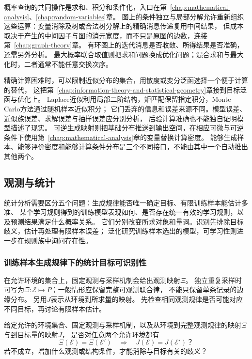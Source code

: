 概率查询的共同操作是求和、积分和条件化，入口在第~\ref{chap:mathematical-analysis}、\ref{chap:random-variables}章。
图上的条件独立与局部分解允许重新组织这些运算：变量消除及树或合法树分解上的精确消息传递复用中间结果，
但成本取决于产生的中间因子与图的消元宽度，而不只是原图的边数，连接第~\ref{chap:graph-theory}章。
有环图上的迭代消息是否收敛、所得结果是否准确，还需另外分析。
最大概率联合取值则把求和问题换成优化问题；混合求和与最大化时，二者通常不能任意交换次序。

精确计算困难时，可以限制近似分布的集合，用散度或变分泛函选择一个便于计算的替代，
这把第~\ref{chap:information-theory-and-statistical-geometry}章接到目标泛函与优化上。
Laplace近似利用局部二阶结构，矩匹配保留指定积分，Monte Carlo方法通过随机样本近似积分；
它们丢弃的信息和误差来源不同。模型误差、近似族误差、求解误差与抽样误差应分别分析，
后验计算准确也不能独自证明模型描述了现实。
可逆生成映射则把基础分布推送到输出空间，在相应可微与可逆条件下使用第~\ref{chap:mathematical-analysis}章的变量替换计算密度。
能够生成样本、能够评价密度和能够计算条件分布是三个不同接口，不能由其中一个自动推出其他两个。

\subsection{观测与统计}
\label{sec:future-data-law-object-map}
\label{sec:future-information-proxy-map}
\label{sec:future-generalization-learnability-map}
\label{sec:future-reliability-map}
\label{sec:future-fairness-alignment-interpretation-map}

统计分析需要区分五个问题：生成规律能否唯一确定目标、有限训练样本能估计多准、
某个学习规则得到的训练模型表现如何、是否存在统一有效的学习规则，以及预测结果满足什么概率关系。
它们分别改变所求对象和量词。识别先排除目标歧义，估计再处理有限样本误差；
泛化研究训练样本选出的模型，可学习性则进一步在规则族中询问存在性。

\subsubsection{训练样本生成规律下的统计目标可识别性}
\label{sec:future-analysis-identification}

在允许环境的集合上，固定观测与采样机制会给出观测映射$\Xi$。
独立重复采样时可写为$\Xi:\mathcal E\mapsto P$；一般情形应保留完整可观测联合律，
不能只保留单条记录的边缘分布。
另用$J$表示从环境到所求量的映射。
先检查相同观测规律是否可能对应不同目标，再讨论有限样本估计。

\begin{mathproblem}[可观测规律是否确定所求量]
  \label{question:future-identification}
  给定允许的环境集合、固定观测与采样机制，以及从环境到完整观测规律的映射$\Xi$
  与到目标量的映射$J$，
  是否对任意两个允许环境都有
  \[
    \Xi(\mathcal E)=\Xi(\mathcal E')
    \quad\Longrightarrow\quad
    J(\mathcal E)=J(\mathcal E')\text{？}
  \]
  若不成立，增加什么观测或结构条件，才能消除与目标有关的歧义？
\end{mathproblem}

